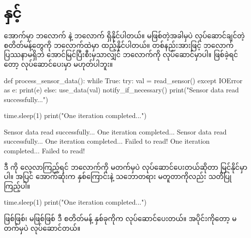 \section{ နှင့် }
 အောက်မှာ  ဘလောက် နဲ့   ဘလောက် ရှိနိုင်ပါတယ်။  မဖြစ်တဲ့အခါမှပဲ လုပ်ဆောင်ချင်တဲ့ စတိတ်မန့်တွေကို  ဘလောက်ထဲမှာ ထည့်နိုင်ပါတယ်။ တစ်နည်း\allowbreak အားဖြင့်  ဘလောက် ပြဿနာမရှိဘဲ အောင်မြင်ပြီးစီးမှသာလျှင်  ဘလောက်ကို လုပ်ဆောင်မှာပါ။  ဖြစ်ခဲ့ရင်တော့ လုပ်ဆောင်ပေးမှာ မဟုတ်ပါဘူး။
%
%
\begin{py}
def process_sensor_data():
    while True:
        try:
            val = read_sensor()
        except IOError as e:
            print(e)
        else:
            use_data(val)
            notify_if_necessary()
            print("Sensor data read successfully...")

        time.sleep(1)
        print("One iteration completed...")
\end{py}
%
%
\begin{codetxt}
Sensor data read successfully...
One iteration completed...
Sensor data read successfully...
One iteration completed...
Failed to read!
One iteration completed...
Failed to read!
\end{codetxt}
ဒီ  ကို လေ့လာကြည့်ရင်  ဘလောက်ကို  မတက်မှပဲ လုပ်ဆောင်ပေးတယ်ဆိုတာ မြင်နိုင်မှာပါ။   အပြင် အောက်ဆုံးက နှစ်ကြောင်းနဲ့ သဘောတရား မတူတာကိုလည်း သတိပြု ကြည့်ပါ။
%
%
\begin{py}
time.sleep(1)
print("One iteration completed...")
\end{py}
%
% 
 ဖြစ်ဖြစ်၊ မဖြစ်ဖြစ် ဒီ စတိတ်မန့် နှစ်ခုကိုက လုပ်ဆောင်ပေးတယ်။  အပိုင်းကိုတော့  မတက်မှပဲ လုပ်ဆောင်တယ်။ 

